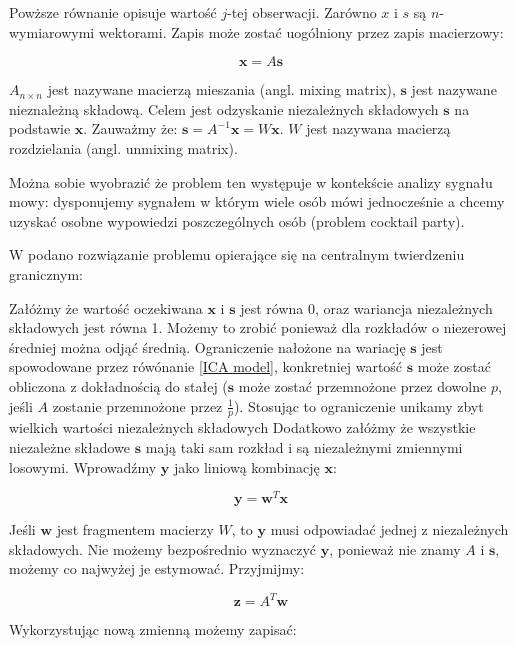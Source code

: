 \documentclass[oneside, eng]{mgr}
\newcommand{\bb}{\textbf}
\begin{document}
Powższe równanie opisuje wartość $j$-tej obserwacji. Zarówno $x$ i $s$ są $n$-wymiarowymi wektorami. Zapis może zostać uogólniony przez zapis macierzowy:

\begin{equation}
	\bb{x} = A \bb{s}
	\label{ICA model}
\end{equation}

$A_{n \times n}$ jest nazywane macierzą mieszania (angl. mixing matrix), $\bb{s}$ jest nazywane nieznależną składową. Celem jest odzyskanie niezależnych składowych $\bb{s}$ na podstawie $\bb{x}$. Zauważmy że: $\bb{s} = A^{-1}\bb{x} = W \bb{x}$. $W$ jest nazywana macierzą rozdzielania (angl. unmixing matrix). 

Można sobie wyobrazić że problem ten występuje w kontekście analizy sygnału mowy: dysponujemy sygnałem w którym wiele osób mówi jednocześnie a chcemy uzyskać osobne wypowiedzi poszczególnych osób (problem cocktail party). 

W \cite{ICA} podano rozwiązanie problemu opierające się na centralnym twierdzeniu granicznym:

Załóżmy że wartość oczekiwana $\bb{x}$ i $\bb{s}$ jest równa 0, oraz wariancja niezależnych składowych jest równa 1. Możemy to zrobić ponieważ dla rozkładów o niezerowej średniej można odjąć średnią. Ograniczenie nałożone na wariację $\bb{s}$ jest spowodowane przez rówónanie \ref{ICA model}, konkretniej wartość $\bb{s}$ może zostać obliczona z dokładnością do stałej ($\bb{s}$ może zostać przemnożone przez dowolne $p$, jeśli $A$ zostanie przemnożone przez $\frac{1}{p}$). Stosując to ograniczenie unikamy zbyt wielkich wartości niezależnych składowych  Dodatkowo załóżmy że wszystkie niezależne składowe $\bb{s}$ mają taki sam rozkład i są niezależnymi zmiennymi losowymi. Wprowadźmy $\bb{y}$ jako liniową kombinację $\bb{x}$:

\begin{equation}
	\bb{y} = \bb{w}^T \bb{x}
\end{equation}

Jeśli $\bb{w}$ jest fragmentem macierzy $W$, to $\bb{y}$ musi odpowiadać jednej z niezależnych składowych. Nie możemy bezpośrednio wyznaczyć $\bb{y}$, ponieważ nie znamy $A$ i $\bb{s}$, możemy co najwyżej je estymować. Przyjmijmy:

\begin{equation}
	\bb{z} = A^T \bb{w}
\end{equation}

Wykorzystując nową zmienną możemy zapisać:
\end{document}
